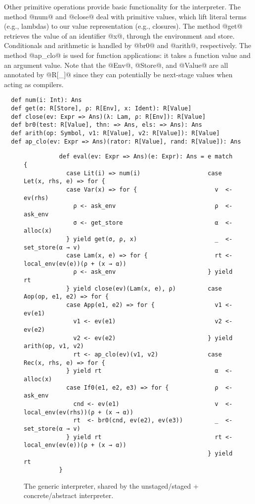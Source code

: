 Other primitive operations provide basic functionality for the
interpreter.  The method @num@ and @close@ deal with primitive values,
which lift literal terms (e.g., lambdas) to our value representation
(e.g., closures).  The method @get@ retrieves the value of an
identifier @x@, through the environment and store. Conditionals and
arithmetic is handled by @br0@ and @arith@, respectively. The method
@ap_clo@ is used for function applications: it takes a function value
and an argument value. Note that the @Env@, @Store@, and @Value@ are
all annotated by @R[_]@ since they can potentially be next-stage
values when acting as compilers.
\begin{lstlisting}
  def num(i: Int): Ans
  def get(σ: R[Store], ρ: R[Env], x: Ident): R[Value]
  def close(ev: Expr => Ans)(λ: Lam, ρ: R[Env]): R[Value]
  def br0(test: R[Value], thn: => Ans, els: => Ans): Ans
  def arith(op: Symbol, v1: R[Value], v2: R[Value]): R[Value]
  def ap_clo(ev: Expr => Ans)(rator: R[Value], rand: R[Value]): Ans
\end{lstlisting}

\begin{figure}[h!]
  \centering
  \begin{lstlisting}
          def eval(ev: Expr => Ans)(e: Expr): Ans = e match {
            case Lit(i) => num(i)                   case Let(x, rhs, e) => for {
            case Var(x) => for {                      v  <- ev(rhs)
              ρ <- ask_env                            ρ  <- ask_env
              σ <- get_store                          α  <- alloc(x)
            } yield get(σ, ρ, x)                      _  <- set_store(α → v)
            case Lam(x, e) => for {                   rt <- local_env(ev(e))(ρ + (x → α))
              ρ <- ask_env                          } yield rt
            } yield close(ev)(Lam(x, e), ρ)         case Aop(op, e1, e2) => for {
            case App(e1, e2) => for {                 v1 <- ev(e1)                                               
              v1 <- ev(e1)                            v2 <- ev(e2)
              v2 <- ev(e2)                          } yield arith(op, v1, v2)
              rt <- ap_clo(ev)(v1, v2)              case Rec(x, rhs, e) => for {
            } yield rt                                α  <- alloc(x)
            case If0(e1, e2, e3) => for {             ρ  <- ask_env
              cnd <- ev(e1)                           v  <- local_env(ev(rhs))(ρ + (x → α))
              rt  <- br0(cnd, ev(e2), ev(e3))         _  <- set_store(α → v)
            } yield rt                                rt <- local_env(ev(e))(ρ + (x → α))
                                                    } yield rt                    
          }
  \end{lstlisting}
\caption{The generic interpreter,
  shared by the unstaged/staged + concrete/abstract interpreter.}
\label{fig:shared_int}
\end{figure}

